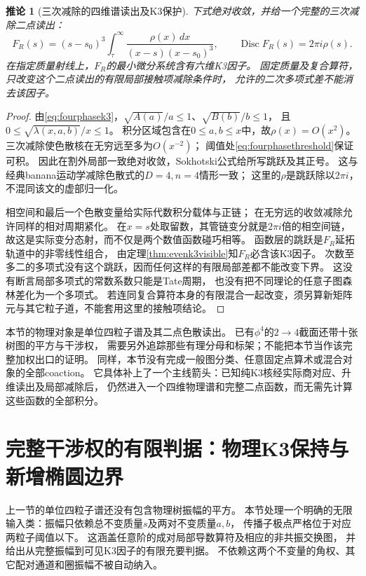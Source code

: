 \documentclass[11pt,a4paper]{ctexart}
\theoremstyle{cnplain}\newtheorem{theorem}{定理}[section]
\newtheorem{corollary}[theorem]{推论}
\theoremstyle{definition}\newtheorem{definition}[theorem]{定义}
\theoremstyle{remark}\newtheorem{remark}[theorem]{注}
\begin{document}
\begin{corollary}[三次减除的四维谱读出及K3保护]\label{cor:evendispersion}
下式绝对收敛，并给一个完整的三次减除二点读出：
\begin{equation}\label{eq:evendispersion}
 F_R(s)=(s-s_0)^3\int_{\tau}^{\infty}
              \frac{\rho(x)\,dx}{(x-s)(x-s_0)^3},\qquad
              \operatorname{Disc}F_R(s)=2\pi i\rho(s).
\end{equation}
在指定质量射线上，$F_R$的最小微分系统含有六维K3因子。
固定质量及复合算符，只改变这个二点读出的有限局部接触项减除条件时，
允许的二次多项式差不能消去该因子。
\end{corollary}
\begin{proof}
由\eqref{eq:fourphasek3}，$\sqrt{A(a)}/a\le1$、$\sqrt{B(b)}/b\le1$，
且$0\le\sqrt{\lambda(x,a,b)}/x\le1$。
积分区域包含在$0\le a,b\le x$中，故$\rho(x)=O(x^2)$。
三次减除使色散核在无穷远至多为$O(x^{-2})$；
阈值处\eqref{eq:fourphasethreshold}保证可积。
因此在割外局部一致绝对收敛，Sokhotski公式给所写跳跃及其正号。
这与经典banana运动学减除色散式的$D=4,n=4$情形一致\cite{KreimerBanana}；
这里的$\rho$是跳跃除以$2\pi i$，不混同该文的虚部归一化。

相空间和最后一个色散变量给实际代数积分载体与正链；
在无穷远的收敛减除允许同样的相对周期紧化。
在$x=s$处取留数，其管链变分就是$2\pi i$倍的相空间链，
故这是实际变分态射，而不仅是两个数值函数碰巧相等。
函数层的跳跃是$F_R$延拓轨道中的非零线性组合，
由定理\ref{thm:evenk3visible}知$F_R$必含该K3因子。
次数至多二的多项式没有这个跳跃，因而任何这样的有限局部差都不能改变下界。
这没有断言局部多项式的常数系数只能是Tate周期，
也没有把不同理论的任意子图森林差化为一个多项式。
若连同复合算符本身的有限混合一起改变，须另算新矩阵元与其它粒子道，不能套用这里的接触项结论。
\end{proof}

本节的物理对象是单位四粒子谱及其二点色散读出。
已有$\phi^4$的$2\to4$截面还带十张树图的平方与干涉权，
需要另外追踪那些有理分母和标架；不能把本节当作该完整加权出口的证明。
同样，本节没有完成一般图分类、任意固定点算术或混合对象的全部coaction。
它具体补上了一个主线箭头：已知纯K3核经实际商对应、升维读出及局部减除后，
仍然进入一个四维物理谱和完整二点函数，而无需先计算这些函数的全部积分。


\section{完整干涉权的有限判据：物理K3保持与新增椭圆边界}\label{sec:weightedk3}
上一节的单位四粒子谱还没有包含物理树振幅的平方。
本节处理一个明确的无限输入类：振幅只依赖总不变质量$s$及两对不变质量$a,b$，
传播子极点严格位于对应两粒子阈值以下。
这涵盖任意阶的成对局部导数算符及相应的非共振交换图，
并给出从完整振幅到可见K3因子的有限充要判据。
不依赖这两个不变量的角权、其它配对通道和圈振幅不被自动纳入。
\end{document}
